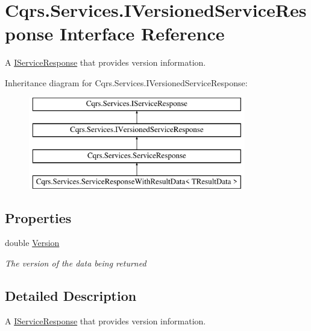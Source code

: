 \hypertarget{interfaceCqrs_1_1Services_1_1IVersionedServiceResponse}{}\section{Cqrs.\+Services.\+I\+Versioned\+Service\+Response Interface Reference}
\label{interfaceCqrs_1_1Services_1_1IVersionedServiceResponse}


A \hyperlink{interfaceCqrs_1_1Services_1_1IServiceResponse}{I\+Service\+Response} that provides version information.  


Inheritance diagram for Cqrs.\+Services.\+I\+Versioned\+Service\+Response\+:\begin{figure}[H]
\begin{center}
\leavevmode
\includegraphics[height=4.000000cm]{interfaceCqrs_1_1Services_1_1IVersionedServiceResponse}
\end{center}
\end{figure}
\subsection*{Properties}
\begin{DoxyCompactItemize}
\item 
double \hyperlink{interfaceCqrs_1_1Services_1_1IVersionedServiceResponse_a74db5cc9544e83d9855370ca8e3ac691_a74db5cc9544e83d9855370ca8e3ac691}{Version}
\begin{DoxyCompactList}\small\item\em The version of the data being returned \end{DoxyCompactList}\end{DoxyCompactItemize}


\subsection{Detailed Description}
A \hyperlink{interfaceCqrs_1_1Services_1_1IServiceResponse}{I\+Service\+Response} that provides version information. 



